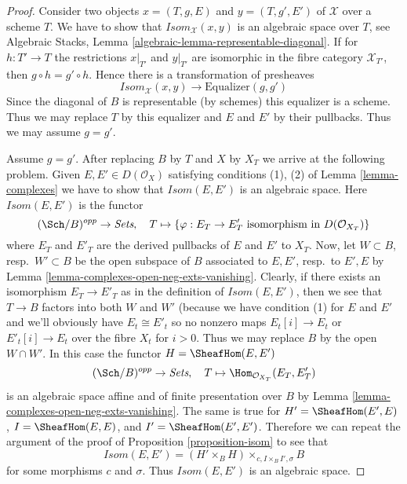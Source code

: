 \begin{proof}
Consider two objects $x = (T, g, E)$ and $y = (T, g', E')$
of $\mathcal{X}$ over a scheme $T$. We have to show that
$\mathit{Isom}_\mathcal{X}(x, y)$ is an algebraic space over $T$, see
Algebraic Stacks, Lemma \ref{algebraic-lemma-representable-diagonal}.
If for $h : T' \to T$ the restrictions $x|_{T'}$ and $y|_{T'}$ are isomorphic
in the fibre category $\mathcal{X}_{T'}$, then $g \circ h = g' \circ h$.
Hence there is a transformation of presheaves
$$
\mathit{Isom}_\mathcal{X}(x, y) \longrightarrow \text{Equalizer}(g, g')
$$
Since the diagonal of $B$ is representable (by schemes) this equalizer is
a scheme. Thus we may replace $T$ by this equalizer and
$E$ and $E'$ by their pullbacks. Thus we may assume $g = g'$.

\medskip\noindent
Assume $g = g'$. After replacing $B$ by $T$ and $X$ by $X_T$ we arrive
at the following problem. Given $E, E' \in D(\mathcal{O}_X)$
satisfying conditions (1), (2) of Lemma \ref{lemma-complexes}
we have to show that $\mathit{Isom}(E, E')$ is an algebraic space.
Here $\mathit{Isom}(E, E')$ is the functor
$$
(\Sch/B)^{opp} \to \textit{Sets},\quad
T \mapsto \{\varphi : E_T \to E'_T
\text{ isomorphism in }D(\mathcal{O}_{X_T})\}
$$
where $E_T$ and $E'_T$ are the derived pullbacks of $E$ and $E'$
to $X_T$. Now, let $W \subset B$, resp.\ $W' \subset B$ be the
open subspace of $B$ associated
to $E, E'$, resp.\ to $E', E$ by
Lemma \ref{lemma-complexes-open-neg-exts-vanishing}.
Clearly, if there exists an isomorphism $E_T \to E'_T$ as in
the definition of $\mathit{Isom}(E, E')$, then we see that
$T \to B$ factors into both $W$ and $W'$ (because we have
condition (1) for $E$ and $E'$ and we'll obviously have
$E_t \cong E'_t$ so no nonzero maps $E_t[i] \to E_t$
or $E'_t[i] \to E_t$ over the fibre $X_t$ for $i > 0$.
Thus we may replace $B$ by the open $W \cap W'$.
In this case the functor $H = \SheafHom(E, E')$
$$
(\Sch/B)^{opp} \to \textit{Sets},\quad T \mapsto
\Hom_{\mathcal{O}_{X_T}}(E_T, E'_T)
$$
is an algebraic space affine and of finite presentation over $B$ by
Lemma \ref{lemma-complexes-open-neg-exts-vanishing}.
The same is true for
$H' = \SheafHom(E', E)$,
$I = \SheafHom(E, E)$, and
$I' = \SheafHom(E', E')$.
Therefore we can repeat the argument of the proof of
Proposition \ref{proposition-isom} to see that
$$
\mathit{Isom}(E, E') = (H' \times_B H) \times_{c, I \times_B I', \sigma} B
$$
for some morphisms $c$ and $\sigma$. Thus
$\mathit{Isom}(E, E')$ is an algebraic space.
\end{proof}

